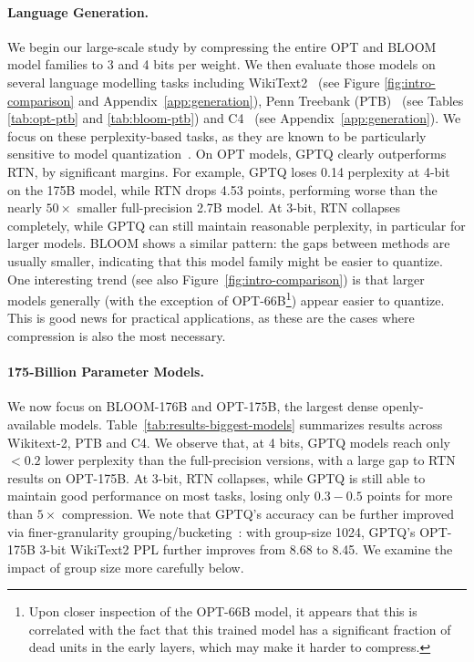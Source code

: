 \paragraph{Language Generation.} We begin our large-scale study by compressing the entire OPT and BLOOM model families to 3 and 4 bits per weight. We then evaluate those models on several language modelling tasks including WikiText2~\cite{wikitext103} (see Figure \ref{fig:intro-comparison} and Appendix~\ref{app:generation}), Penn Treebank (PTB)~\cite{PTB} (see Tables \ref{tab:opt-ptb} and \ref{tab:bloom-ptb}) and C4~\cite{C4} (see Appendix~\ref{app:generation}). 
We focus on these perplexity-based tasks, as they are known to be particularly sensitive to model quantization~\cite{yao2022zeroquant}. On OPT models, GPTQ clearly outperforms RTN, by significant margins. For example, GPTQ loses 0.14 perplexity at 4-bit on the 175B model, while RTN drops 4.53 points, performing worse than the nearly $50\times$ smaller full-precision 2.7B model. At 3-bit, RTN collapses completely, while GPTQ can still maintain reasonable perplexity, in particular for larger models. BLOOM shows a similar pattern: the gaps between methods are usually smaller, indicating that this model family might be easier to quantize. One interesting trend (see also Figure~\ref{fig:intro-comparison}) is that larger models generally (with the exception of OPT-66B\footnote{Upon closer inspection of the OPT-66B model, it appears that this is correlated with the fact that this trained model has a significant fraction of dead units in the early layers, which may make it harder to compress.}) appear easier to quantize. This is good news for practical applications, as these are the cases where compression is also the most necessary.

\paragraph{175-Billion Parameter Models.} We now focus on BLOOM-176B and OPT-175B, the largest dense openly-available models. 
Table~\ref{tab:results-biggest-models} summarizes results across Wikitext-2, PTB and C4. We observe that, at 4 bits, GPTQ models reach only $< 0.2$ lower perplexity than the full-precision versions, with a large gap to RTN results on OPT-175B. At 3-bit, RTN collapses, while GPTQ is still able to maintain good performance on most tasks, losing only $0.3 - 0.5$ points for more than $5\times$ compression. We note that GPTQ's accuracy can be further improved via finer-granularity grouping/bucketing~\cite{alistarh2016qsgd, park2022nuqmm}: with group-size 1024, GPTQ's OPT-175B 3-bit WikiText2 PPL further improves from 8.68 to 8.45. We examine the impact of group size more carefully below. 

